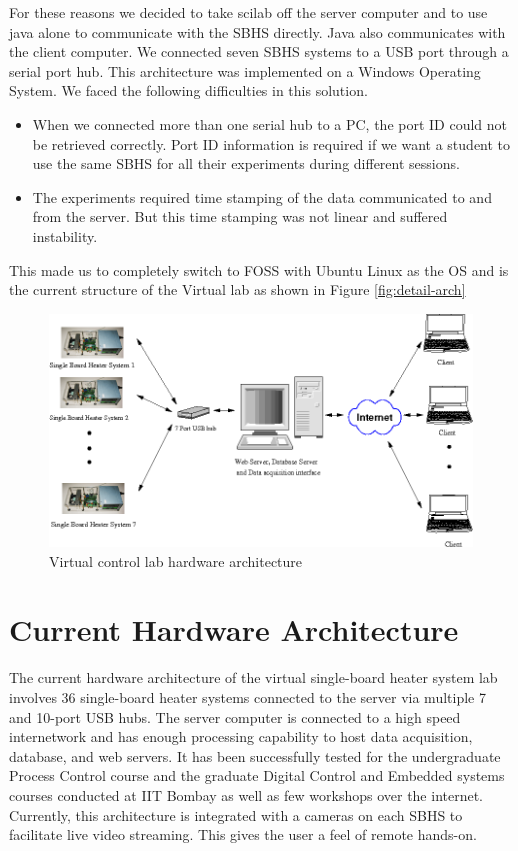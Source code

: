 For these reasons  we decided to take scilab off the server computer
and to use java alone to communicate with the SBHS directly.  Java
also 
communicates with the client computer.  We connected seven SBHS
systems to a USB port through a serial port hub.  This architecture
was 
implemented on a Windows Operating System.  We faced the following
difficulties in this solution.
\begin{itemize}
\item When we connected more than one serial hub to a PC, the port ID
  could not be retrieved correctly.  Port ID information is required
  if we want a student to use the same SBHS for all their experiments
  during different sessions.
\item The experiments required time stamping of the data communicated
  to and from the server. But this time stamping was not linear and
  suffered instability.  
\end{itemize}%
This made us to completely switch to FOSS with Ubuntu Linux as the OS
and is the current structure of the Virtual lab as shown in Figure
\ref{fig:detail-arch} 

\begin{figure}
\centering
\includegraphics[width=\linewidth]{IEEE-Chile/figures/vlab-arch}
\caption{Virtual control lab hardware architecture}
\label{fig:hw-arch}
\end{figure}

\section{Current Hardware Architecture}
The current hardware architecture of the virtual single-board heater system lab involves 36 single-board heater systems connected to the server via multiple 7 and 10-port USB hubs. The server computer is connected to a high speed internetwork and has enough processing capability to host data acquisition, database, and web servers. 
It has been successfully tested for the undergraduate Process Control course and the graduate Digital Control and Embedded systems courses conducted at IIT Bombay as well as few workshops over the internet. Currently, this architecture is integrated with a cameras on each SBHS to facilitate live video streaming. This gives the user a feel of remote hands-on. 

